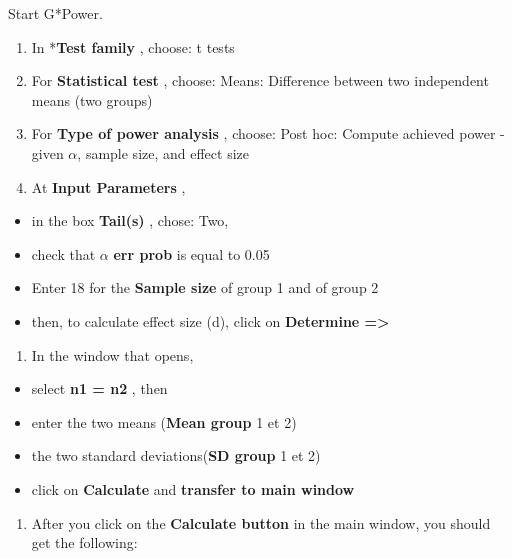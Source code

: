\documentclass[
  12pt,
]{book}
\providecommand{\tightlist}{%
  \setlength{\itemsep}{0pt}\setlength{\parskip}{0pt}}
\begin{document}
Start G*Power.

\begin{enumerate}
\def\labelenumi{\arabic{enumi}.}
\tightlist
\item
  In *\textbf{Test family} , choose: t tests
\item
  For \textbf{Statistical test} , choose: Means: Difference between two independent means (two groups)
\item
  For \textbf{Type of power analysis} , choose: Post hoc: Compute achieved power - given \(\alpha\), sample size, and effect size
\item
  At \textbf{Input Parameters} ,
\end{enumerate}

\begin{itemize}
\tightlist
\item
  in the box \textbf{Tail(s)} , chose: Two,
\item
  check that \(\alpha\) \textbf{err prob} is equal to 0.05
\item
  Enter 18 for the \textbf{Sample size} of group 1 and of group 2
\item
  then, to calculate effect size (d), click on \textbf{Determine =\textgreater{}}
\end{itemize}

\begin{enumerate}
\def\labelenumi{\arabic{enumi}.}
\setcounter{enumi}{4}
\tightlist
\item
  In the window that opens,
\end{enumerate}

\begin{itemize}
\tightlist
\item
  select \textbf{n1 = n2} , then
\item
  enter the two means (\textbf{Mean group} 1 et 2)
\item
  the two standard deviations(\textbf{SD group} 1 et 2)
\item
  click on \textbf{Calculate} and \textbf{transfer to main window}
\end{itemize}

\begin{enumerate}
\def\labelenumi{\arabic{enumi}.}
\setcounter{enumi}{5}
\tightlist
\item
  After you click on the \textbf{Calculate button} in the main window, you
  should get the following:
\end{enumerate}
\end{document}
